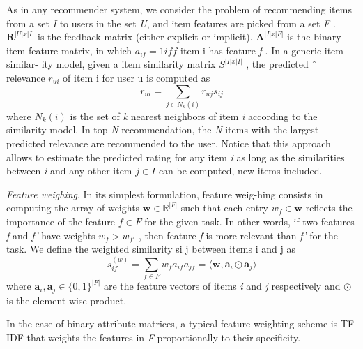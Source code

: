 \documentclass{sig-alternate}
\begin{document}
As in any recommender system, we consider the problem of recommending
items from a set \textit{I} to users in the set \textit{U}, and item features
are picked from a set \textit{F} . $\textbf{R}^{|U |x |I |}$ is the feedback matrix (either
explicit or implicit). $\textbf{A}^{|I |x |F |}$ is the binary item feature matrix, in
which $a_{if} = 1 iff$ item i has feature \textit{f} . In a generic item similar-
ity model, given a item similarity matrix $S^{|I |x |I |}$ , the predicted
ˆ relevance $r_{ui}$ of item i for user u is computed as
\begin{equation}
    r_{ui}=\sum_{j\in N_k(i)}r_{uj}s_{ij}
\label{v1}
\end{equation}
where $N_k (i)$ is the set of \textit{k} nearest 
neighbors of item \textit{i} according
to the similarity model. In top-\textit{N} recommendation, the \textit{N} items
with the largest predicted relevance are recommended to the user.
Notice that this approach allows to estimate the predicted rating
for any item \textit{i} as long as the similarities between \textit{i} and any other
item $j\in I$ can be computed, new items included.
\newline

\textit{Feature weighing}. In its simplest formulation, feature weig-hing
consists in computing the array of weights $\textbf{w} \in \mathbb{R}^{|F |}$ such that each
entry $w_f \in \textbf{w}$ reflects the importance of the feature $f\in F$ for the
given task. In other words, if two features \textit{f} and \textit{f'} have weights
$w_f > w_{f'}$ , then feature \textit{f} is more relevant than \textit{f'} for the task.
We define the weighted similarity si j between items i and j as
\begin{equation}
    s_{if}^{(w)}=\sum_{f\in F}w_fa_{if}a_{jf}=\langle \textbf{w},\textbf{a}_i\odot \textbf{a}_j\rangle
\label{v2}
\end{equation}
where $\textbf{a}_i , \textbf{a}_j \in \{0, 1\}^{|F |}$ are the feature vectors of items \textit{i} and \textit{j}
respectively and $\odot$ is the element-wise product.

In the case of binary attribute matrices, a typical feature weighting
scheme is TF-IDF that weights the features in \textit{F} proportionally
to their specificity.
\newline
\end{document}
